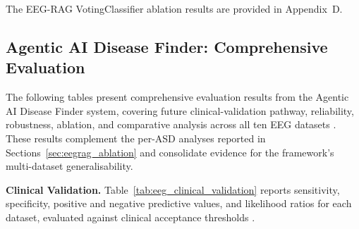 \fi %
\fi

The EEG-RAG VotingClassifier ablation results are provided in Appendix~D.


\subsection{Agentic AI Disease Finder: Comprehensive Evaluation}

\iffalse %
The following tables present comprehensive evaluation results from the Agentic AI Disease Finder system, covering future clinical-validation pathway, reliability, robustness, ablation, and comparative analysis across all ten EEG datasets \cite{asthana2025eegmaster}. These results complement the per-ASD analyses reported in Sections~\ref{sec:eegrag_ablation} and consolidate evidence for the framework's multi-dataset generalisability.

\noindent\textbf{Clinical Validation.}\quad
Table~\ref{tab:eeg_clinical_validation} reports sensitivity, specificity, positive and negative predictive values, and likelihood ratios for each dataset, evaluated against clinical acceptance thresholds \cite{asthana2025eegmaster}.


